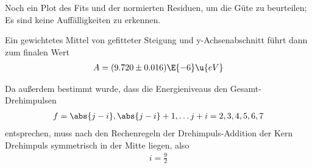 \documentclass[ex, minted]{exercise_4.0}
\begin{document}

Noch ein Plot des Fits und der normierten Residuen, um die Güte zu beurteilen; Es sind keine Auffälligkeiten zu erkennen.






Ein gewichtetes Mittel von gefitteter Steigung und y-Achsenabschnitt führt dann zum finalen Wert
\begin{align*}
    A = (9.720\pm 0.016) \E{-6} \u{eV}
\end{align*}  

Da außerdem bestimmt wurde, dass die Energieniveaus den Gesamt-Drehimpulsen
\begin{align*}
    f = \abs{j-i}, \abs{j-i}+1,\dots j+i= 2, 3,4,5,6, 7
\end{align*} 
entsprechen, muss nach den Rechenregeln der Drehimpuls-Addition
der Kern Drehimpuls symmetrisch in der Mitte liegen, also 
\begin{align*}
    i = \frac92 
\end{align*}
\end{document}
